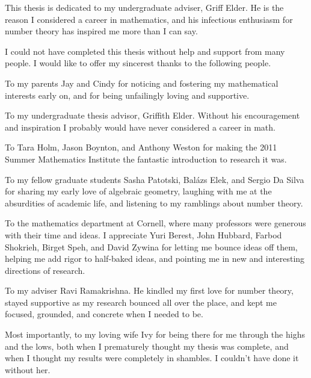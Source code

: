 \documentclass[phd,cornellheadings,tocprelim]{cornell}
\begin{document}
\begin{dedication}
This thesis is dedicated to my undergraduate adviser, Griff Elder. He is the 
reason I considered a career in mathematics, and his infectious enthusiasm 
for number theory has inspired me more than I can say. 
\end{dedication}

\begin{acknowledgements}
I could not have completed this thesis without help and support from many 
people. I would like to offer my sincerest thanks to the following people. 

To my parents Jay and Cindy for noticing and fostering my mathematical 
interests early on, and for being unfailingly loving and supportive. 

To my undergraduate thesis advisor, Griffith Elder. Without his encouragement 
and inspiration I probably would have never considered a career in math. 

To Tara Holm, Jason Boynton, and Anthony Weston for making the 2011 Summer 
Mathematics Institute the fantastic introduction to research it was. 

To my fellow graduate students Sasha Patotski, Bal\'azs Elek, and Sergio Da 
Silva for sharing my early love of algebraic geometry, laughing with me at the 
absurdities of academic life, and listening to my ramblings about number theory. 

To the mathematics department at Cornell, where many professors were generous 
with their time and ideas. I appreciate Yuri Berest, John Hubbard, Farbod 
Shokrieh, Birget Speh, and David Zywina for letting me bounce ideas off them, 
helping me add rigor to half-baked ideas, and pointing me in new and 
interesting directions of research. 

To my adviser Ravi Ramakrishna. He kindled my first love for number theory, 
stayed supportive as my research bounced all over the place, and kept me 
focused, grounded, and concrete when I needed to be. 

Most importantly, to my loving wife Ivy for being there for me through the highs 
and the lows, both when I prematurely thought my thesis was complete, and when I 
thought my results were completely in shambles. I couldn't have done it without 
her. 
\end{acknowledgements}

\contentspage
\normalspacing
\setcounter{page}{1}
\pagestyle{cornell}
\addtolength{\parskip}{0.5\baselineskip}
















\printbibliography[heading=bibintoc]
\end{document}
